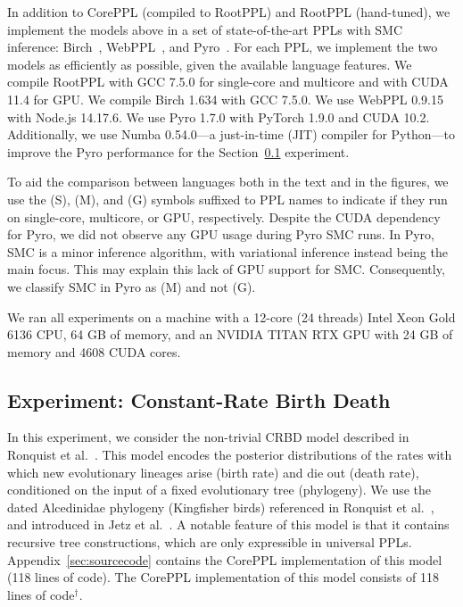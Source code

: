 \documentclass[runningheads]{llncs}
\begin{document}
In addition to CorePPL (compiled to RootPPL) and RootPPL (hand-tuned), we implement the models above in a set of state-of-the-art PPLs with SMC inference: Birch~\cite{murray2018automated}, WebPPL~\cite{goodman2014design}, and Pyro~\cite{bingham2019pyro}.
For each PPL, we implement the two models as efficiently as possible, given the available language features.
We compile RootPPL with GCC 7.5.0 for single-core and multicore and with CUDA 11.4 for GPU.
We compile Birch 1.634 with GCC 7.5.0.
We use WebPPL 0.9.15 with Node.js 14.17.6.
We use Pyro 1.7.0 with PyTorch 1.9.0 and CUDA 10.2.
Additionally, we use Numba 0.54.0---a just-in-time (JIT) compiler for Python---to improve the Pyro performance for the Section~\ref{sec:expcrbd} experiment.

To aid the comparison between languages both in the text and in the figures, we use the (S), (M), and (G) symbols suffixed to PPL names to indicate if they run on single-core, multicore, or GPU, respectively.
Despite the CUDA dependency for Pyro, we did not observe any GPU usage during Pyro SMC runs.
In Pyro, SMC is a minor inference algorithm, with variational inference instead being the main focus.
This may explain this lack of GPU support for SMC.
Consequently, we classify SMC in Pyro as (M) and not (G).

We ran all experiments on a machine with a 12-core (24 threads) Intel Xeon Gold 6136 CPU, 64 GB of memory, and an NVIDIA TITAN RTX GPU with 24 GB of memory and 4608 CUDA cores.

\subsection{Experiment: Constant-Rate Birth Death}\label{sec:expcrbd}
In this experiment, we consider the non-trivial CRBD model described in Ronquist et al.~\cite{ronquist2021universal}.
This model encodes the posterior distributions of the rates with which new evolutionary lineages arise (birth rate) and die out (death rate), conditioned on the input of a fixed evolutionary tree (phylogeny).
We use the dated Alcedinidae phylogeny (Kingfisher birds) referenced in Ronquist et al.~\cite{ronquist2021universal}, and introduced in Jetz et al.~\cite{jetz2012global}.
A notable feature of this model is that it contains recursive tree constructions, which are only expressible in universal PPLs.
\ifextended
Appendix~\ref{sec:sourcecode} contains the CorePPL implementation of this model (118 lines of code).
\else
The CorePPL implementation of this model consists of 118 lines of code$^\dagger$.
\fi
\end{document}

